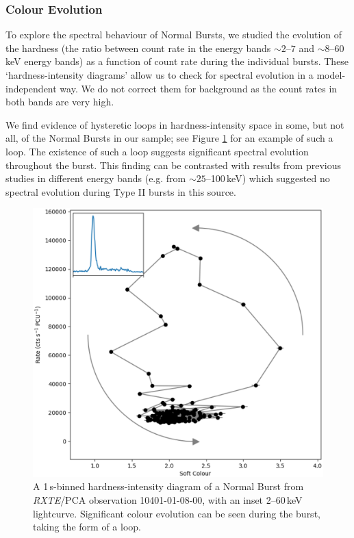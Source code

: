 \subsubsection{Colour Evolution}

\par To explore the spectral behaviour of Normal Bursts, we studied the evolution of the hardness (the ratio between count rate in the energy bands $\sim2$--$7$ and $\sim8$--$60$\,keV energy bands) as a function of count rate during the individual bursts.  These `hardness-intensity diagrams' allow us to check for spectral evolution in a model-independent way.  We do not correct them for background as the count rates in both bands are very high.
\par We find evidence of hysteretic loops in hardness-intensity space in some, but not all, of the Normal Bursts in our sample; see Figure \ref{fig:loop} for an example of such a loop.  The existence of such a loop suggests significant spectral evolution throughout the burst.  This finding can be contrasted with results from previous studies in different energy bands (e.g. \citealp{Woods_OB2} from $\sim25$--100\,keV) which suggested no spectral evolution during Type II bursts in this source.

\begin{figure}
  \centering
  \includegraphics[width=.9\linewidth, trim={0.4cm 1cm 1.1cm 1cm},clip]{images/Loop1.eps}
  \caption[A hardness-intensity diagram of a typical Normal Burst.]{\small A 1\,s-binned hardness-intensity diagram of a Normal Burst from \textit{RXTE}/PCA observation 10401-01-08-00, with an inset 2--60\,keV lightcurve.  Significant colour evolution can be seen during the burst, taking the form of a loop.}
  \label{fig:loop}
\end{figure}

